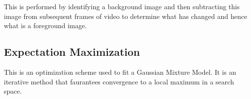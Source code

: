 This is performed by identifying a background image and then subtracting this image from subsequent frames of video to determine what has changed and hence what is a foreground image.

\subsection{Expectation Maximization}

This is an optimization scheme used to fit a Gaussian Mixture Model. It is an iterative method that faurantees convergence to a local maximum in a search space.